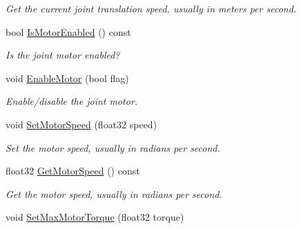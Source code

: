 \begin{DoxyCompactItemize}
\begin{DoxyCompactList}\small\item\em Get the current joint translation speed, usually in meters per second. \end{DoxyCompactList}\item 
\hypertarget{classb2_wheel_joint_a419bc80e17cc4c1062a692ea79396d19}{bool \hyperlink{classb2_wheel_joint_a419bc80e17cc4c1062a692ea79396d19}{Is\-Motor\-Enabled} () const }\label{classb2_wheel_joint_a419bc80e17cc4c1062a692ea79396d19}

\begin{DoxyCompactList}\small\item\em Is the joint motor enabled? \end{DoxyCompactList}\item 
\hypertarget{classb2_wheel_joint_a7a832d814bdda135a78fad41ba671da6}{void \hyperlink{classb2_wheel_joint_a7a832d814bdda135a78fad41ba671da6}{Enable\-Motor} (bool flag)}\label{classb2_wheel_joint_a7a832d814bdda135a78fad41ba671da6}

\begin{DoxyCompactList}\small\item\em Enable/disable the joint motor. \end{DoxyCompactList}\item 
\hypertarget{classb2_wheel_joint_a6e3255fcf5c82b979ad7e3dc1c089c0b}{void \hyperlink{classb2_wheel_joint_a6e3255fcf5c82b979ad7e3dc1c089c0b}{Set\-Motor\-Speed} (float32 speed)}\label{classb2_wheel_joint_a6e3255fcf5c82b979ad7e3dc1c089c0b}

\begin{DoxyCompactList}\small\item\em Set the motor speed, usually in radians per second. \end{DoxyCompactList}\item 
\hypertarget{classb2_wheel_joint_acc7a31fdd444614ba1943f57f0c6ac5a}{float32 \hyperlink{classb2_wheel_joint_acc7a31fdd444614ba1943f57f0c6ac5a}{Get\-Motor\-Speed} () const }\label{classb2_wheel_joint_acc7a31fdd444614ba1943f57f0c6ac5a}

\begin{DoxyCompactList}\small\item\em Get the motor speed, usually in radians per second. \end{DoxyCompactList}\item 
\hypertarget{classb2_wheel_joint_a8aae3cd624ec9d48fc86c325c4595edc}{void \hyperlink{classb2_wheel_joint_a8aae3cd624ec9d48fc86c325c4595edc}{Set\-Max\-Motor\-Torque} (float32 torque)}\label{classb2_wheel_joint_a8aae3cd624ec9d48fc86c325c4595edc}


\end{DoxyCompactItemize}
